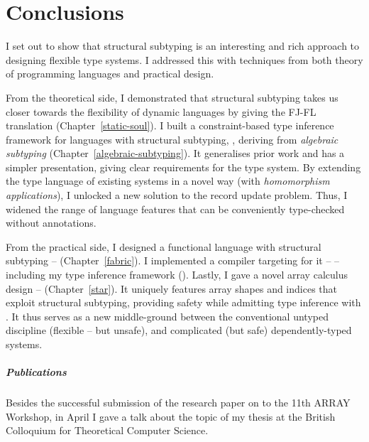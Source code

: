 \chapter{Conclusions}
\label{conclusions}

I set out to show that structural subtyping is an interesting and rich approach to designing flexible type systems. I addressed this with techniques from both theory of programming languages and practical design.

From the theoretical side, I demonstrated that structural subtyping takes us closer towards the flexibility of dynamic languages by giving the FJ-FL translation (Chapter~\ref{static-soul}). 
I built a constraint-based type inference framework for languages with structural subtyping, \textbf{\inference{}}, deriving from \emph{algebraic subtyping} (Chapter~\ref{algebraic-subtyping}). 
It generalises prior work and has a simpler presentation, giving clear requirements for the type system.
By extending the type language of existing systems in a novel way (with \emph{homomorphism applications}), I unlocked a new solution to the record update problem. 
Thus, I widened the range of language features that can be conveniently type-checked without annotations.

From the practical side, I designed a functional language with structural subtyping -- \textbf{\fabric} (Chapter~\ref{fabric}). 
I implemented a compiler targeting \wasm{} for it -- \compiler{} -- including my type inference framework (\inference{}).
Lastly, I gave a novel array calculus design -- \textbf{\starr{}} (Chapter~\ref{star}). It uniquely features array shapes and indices that exploit structural subtyping, providing safety while admitting type inference with \inference{}. It thus serves as a new middle-ground between the conventional untyped discipline (flexible -- but unsafe), and complicated (but safe) dependently-typed systems. 

\paragraph{Publications} Besides the successful submission of the research paper on \starr{} to the 11th ARRAY Workshop, in April I gave a talk about the topic of my thesis at the British Colloquium for Theoretical Computer Science.

